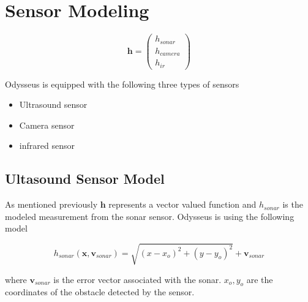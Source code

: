 \section{Sensor Modeling}

\begin{equation}
\mathbf{h} = \begin{pmatrix}
h_{sonar} \\
h_{camera} \\
h_{ir}
\end{pmatrix}
\end{equation}


Odysseus is equipped with the following three types of sensors

\begin{itemize}
	\item Ultrasound sensor
	\item Camera sensor
	\item infrared sensor
\end{itemize}

\subsection{Ultasound Sensor Model}

As mentioned previously $\mathbf{h}$ represents a vector valued function and $h_{sonar}$ is the modeled measurement from the
sonar sensor. Odysseus is using the following model

\begin{equation}
h_{sonar}(\mathbf{x}, \mathbf{v}_{sonar}) = \sqrt{(x - x_o)^2 + (y - y_o)^2} +  \mathbf{v}_{sonar}
\label{sonar_h}
\end{equation} 

where $\mathbf{v}_{sonar}$ is the error vector associated with the sonar. $x_o, y_o$ are the coordinates of the
obstacle detected by the sensor.

